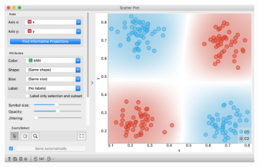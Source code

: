 \begin{figure}[h]
    \centering
    \includegraphics[scale=0.4]{knn-orange.png}
    \caption{$\;$}
\end{figure}
